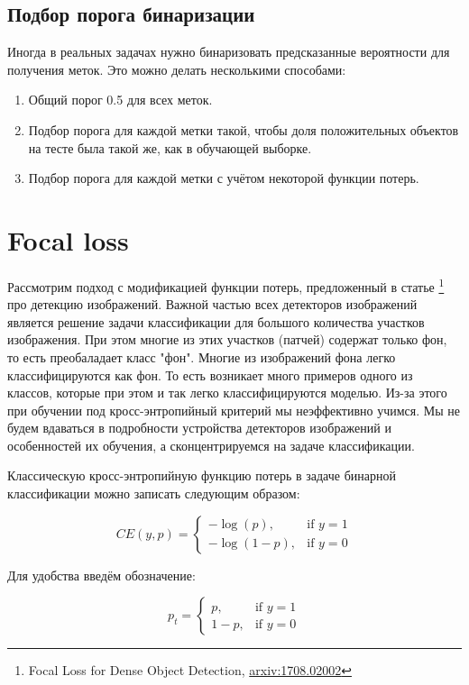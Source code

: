 \documentclass[12pt,fleqn]{article}
\begin{document}
\subsection{Подбор порога бинаризации}

Иногда в реальных задачах нужно бинаризовать предсказанные вероятности для получения меток. Это можно делать несколькими способами:

\begin{enumerate}
    \item Общий порог 0.5 для всех меток.
    \item Подбор порога для каждой метки такой, чтобы доля положительных объектов на тесте была такой же, как в обучающей выборке.
    \item Подбор порога для каждой метки с учётом некоторой функции потерь.
\end{enumerate}

\section{Focal loss}

Рассмотрим подход с модификацией функции потерь, предложенный в статье \footnote{Focal Loss for Dense Object Detection, \href{https://arxiv.org/pdf/1708.02002.pdf}{arxiv:1708.02002}} про детекцию изображений. Важной частью всех детекторов изображений является решение задачи классификации для большого количества участков изображения. При этом многие из этих участков (патчей) содержат только фон, то есть преобаладает класс "фон". Многие из изображений фона легко классифицируются как фон. То есть возникает много примеров одного из классов, которые при этом и так легко классифицируются моделью. Из-за этого при обучении под кросс-энтропийный критерий мы неэффективно учимся. Мы не будем вдаваться в подробности устройства детекторов изображений и особенностей их обучения, а сконцентрируемся на задаче классификации.

Классическую кросс-энтропийную функцию потерь в задаче бинарной классификации можно записать следующим образом:

$$
CE(y, p) = \begin{cases} - \log (p), & \mbox{if } y = 1 \\ - \log (1-p), & \mbox{if } y = 0 \end{cases}
$$

Для удобства введём обозначение:

$$
p_t = \begin{cases} p, & \mbox{if } y = 1 \\ 1 - p, & \mbox{if } y = 0 \end{cases}
$$
\end{document}
